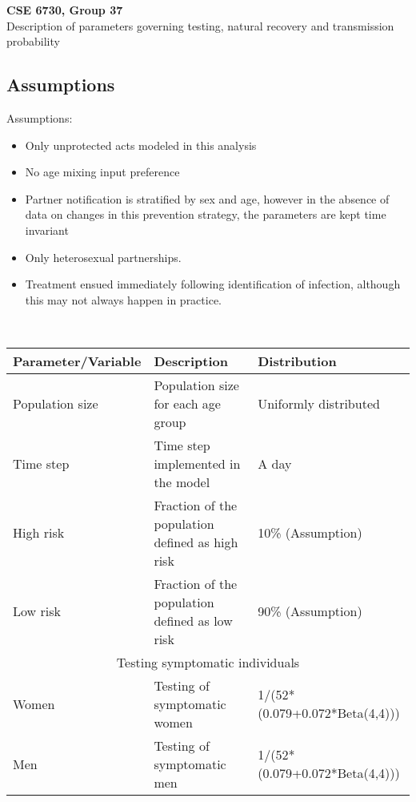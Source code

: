 \documentclass{article}
\begin{document}
	\begin{center}
    
		\LARGE{\textbf{CSE 6730, Group 37}} \\
        \vspace{1em}
        \Large{Description of parameters governing testing, natural recovery and transmission probability} \\
     
	\end{center}
    \begin{normalsize}
    

   	
   	\section{Assumptions}
   	
   	Assumptions:\\
   	\begin{itemize}
   	    \item Only unprotected acts modeled in this analysis
   	    \item No age mixing input preference
   	    \item Partner notification is stratified by sex and age, however in the absence of data on changes in this prevention strategy, the parameters are kept time invariant
   	    \item Only heterosexual partnerships.
   	    \item Treatment ensued immediately following identification of infection, although this may not always happen in practice.
   	\end{itemize}\\
    

	
	\begin{table}[H]
	\centering
    	\begin{tabular}{ |p{5cm}|p{7cm}|p{5cm}| } 
    		\hline
    		Parameter/Variable & Description & Distribution  \\ 
    		\hline
    		Population size & Population size for each age group & Uniformly distributed\\
    		Time step &	Time step implemented in the model & 	A day \\
			High risk & Fraction of the population defined as high risk	& 10\% (Assumption) \\
			Low risk & Fraction of the population defined as low risk & 90\% (Assumption)\\
			\hline
			\multicolumn{3}{|c|}{Testing symptomatic individuals} \\
			\hline
			Women &	Testing of symptomatic  women	& 1/(52*(0.079+0.072*Beta(4,4)))\\
			Men	& Testing of symptomatic men	& 1/(52*(0.079+0.072*Beta(4,4)))\\
			\hline
			

\end{tabular}
\end{table}
\end{normalsize}
\end{document}
